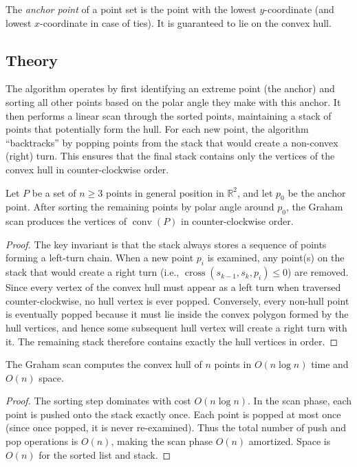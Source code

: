 \begin{definition}\label{def:anchor_point}
The \emph{anchor point} of a point set is the point with the lowest $y$-coordinate (and lowest $x$-coordinate in case of ties). It is guaranteed to lie on the convex hull.
\end{definition}

\subsection{Theory}

The algorithm operates by first identifying an extreme point (the anchor) and sorting all other points based on the polar angle they make with this anchor. It then performs a linear scan through the sorted points, maintaining a stack of points that potentially form the hull. For each new point, the algorithm ``backtracks'' by popping points from the stack that would create a non-convex (right) turn. This ensures that the final stack contains only the vertices of the convex hull in counter-clockwise order.

\begin{theorem}\label{thm:graham_scan_correctness}
Let $P$ be a set of $n \ge 3$ points in general position in $\mathbb{R}^2$, and let $p_0$ be the anchor point. After sorting the remaining points by polar angle around $p_0$, the Graham scan produces the vertices of $\operatorname{conv}(P)$ in counter-clockwise order.
\end{theorem}
\begin{proof}
The key invariant is that the stack always stores a sequence of points forming a left-turn chain. When a new point $p_i$ is examined, any point(s) on the stack that would create a right turn (i.e., $\operatorname{cross}(s_{k-1}, s_k, p_i) \le 0$) are removed. Since every vertex of the convex hull must appear as a left turn when traversed counter-clockwise, no hull vertex is ever popped. Conversely, every non-hull point is eventually popped because it must lie inside the convex polygon formed by the hull vertices, and hence some subsequent hull vertex will create a right turn with it. The remaining stack therefore contains exactly the hull vertices in order.
\end{proof}

\begin{theorem}\label{thm:graham_scan_complexity}
The Graham scan computes the convex hull of $n$ points in $O(n \log n)$ time and $O(n)$ space.
\end{theorem}
\begin{proof}
The sorting step dominates with cost $O(n \log n)$. In the scan phase, each point is pushed onto the stack exactly once. Each point is popped at most once (since once popped, it is never re-examined). Thus the total number of push and pop operations is $O(n)$, making the scan phase $O(n)$ amortized. Space is $O(n)$ for the sorted list and stack.
\end{proof}

